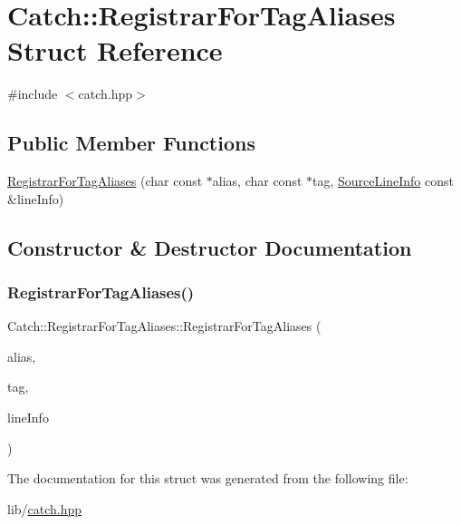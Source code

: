 \hypertarget{struct_catch_1_1_registrar_for_tag_aliases}{}\section{Catch\+:\+:Registrar\+For\+Tag\+Aliases Struct Reference}
\label{struct_catch_1_1_registrar_for_tag_aliases}


{\ttfamily \#include $<$catch.\+hpp$>$}

\subsection*{Public Member Functions}
\begin{DoxyCompactItemize}
\item 
\hyperlink{struct_catch_1_1_registrar_for_tag_aliases_ae4e45830e4763bcd65d55d8db9167b69}{Registrar\+For\+Tag\+Aliases} (char const $\ast$alias, char const $\ast$tag, \hyperlink{struct_catch_1_1_source_line_info}{Source\+Line\+Info} const \&line\+Info)
\end{DoxyCompactItemize}


\subsection{Constructor \& Destructor Documentation}
\hypertarget{struct_catch_1_1_registrar_for_tag_aliases_ae4e45830e4763bcd65d55d8db9167b69}{}\label{struct_catch_1_1_registrar_for_tag_aliases_ae4e45830e4763bcd65d55d8db9167b69} 
\subsubsection{\texorpdfstring{Registrar\+For\+Tag\+Aliases()}{RegistrarForTagAliases()}}
{\footnotesize\ttfamily Catch\+::\+Registrar\+For\+Tag\+Aliases\+::\+Registrar\+For\+Tag\+Aliases (\begin{DoxyParamCaption}\item[{char const $\ast$}]{alias,  }\item[{char const $\ast$}]{tag,  }\item[{\hyperlink{struct_catch_1_1_source_line_info}{Source\+Line\+Info} const \&}]{line\+Info }\end{DoxyParamCaption})}



The documentation for this struct was generated from the following file\+:\begin{DoxyCompactItemize}
\item 
lib/\hyperlink{catch_8hpp}{catch.\+hpp}\end{DoxyCompactItemize}
